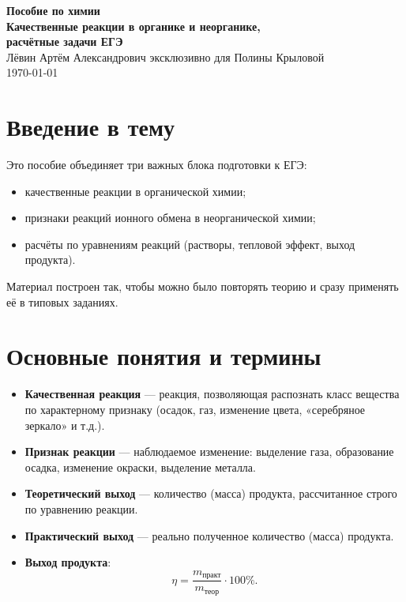 \documentclass[a4paper,12pt]{article}
\begin{document}
\begin{titlepage}
    \centering
    \vspace*{2.2cm}
    {\LARGE \textbf{Пособие по химии}}\\[0.4cm]
    {\Large \textbf{Качественные реакции в органике и неорганике,\\
    расчётные задачи ЕГЭ}}\\[1.2cm]
    {\large Лёвин Артём Александрович эксклюзивно для Полины Крыловой}\\[0.6cm]
    {\large \today}

    \vfill
\end{titlepage}

\tableofcontents
\newpage

\section{Введение в тему}
Это пособие объединяет три важных блока подготовки к ЕГЭ:
\begin{itemize}
    \item качественные реакции в органической химии;
    \item признаки реакций ионного обмена в неорганической химии;
    \item расчёты по уравнениям реакций (растворы, тепловой эффект, выход продукта).
\end{itemize}
Материал построен так, чтобы можно было повторять теорию и сразу применять её в типовых заданиях.

\section{Основные понятия и термины}
\begin{itemize}
    \item \textbf{Качественная реакция} --- реакция, позволяющая распознать класс вещества по характерному признаку (осадок, газ, изменение цвета, «серебряное зеркало» и т.д.).
    \item \textbf{Признак реакции} --- наблюдаемое изменение: выделение газа, образование осадка, изменение окраски, выделение металла.
    \item \textbf{Теоретический выход} --- количество (масса) продукта, рассчитанное строго по уравнению реакции.
    \item \textbf{Практический выход} --- реально полученное количество (масса) продукта.
    \item \textbf{Выход продукта}:
    \[
    \eta = \frac{m_{\text{практ}}}{m_{\text{теор}}}\cdot 100\%.
    \]
\end{itemize}
\end{document}
